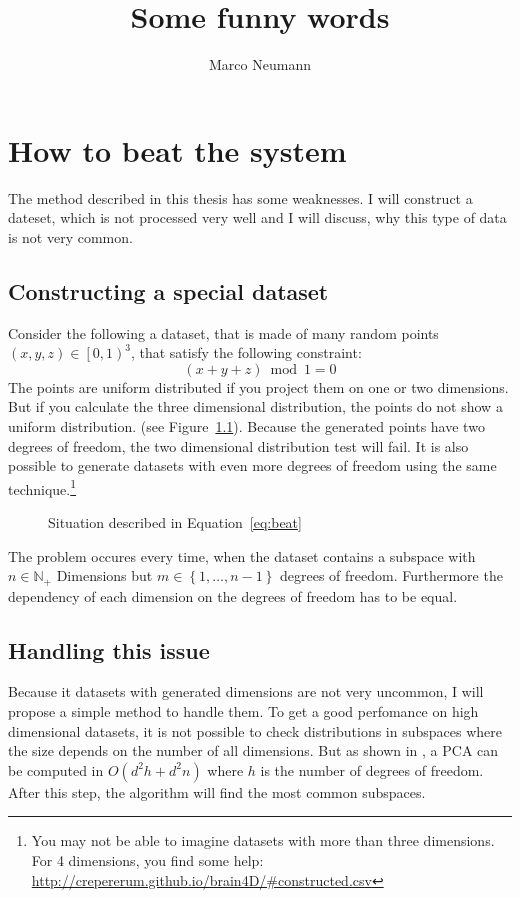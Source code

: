 \documentclass[%
	fontsize=11pt,%
	paper=a4,%
	pagesize,%
	twoside=false,%
	listof=totoc,%
	draft%
]{scrbook}
\title{Some funny words}
\author{Marco Neumann}
\newcommand{\set}[1]{\mathbb{#1}}
\begin{document}
\frontmatter
\maketitle
\tableofcontents

\mainmatter
\chapter{How to beat the system}
The method described in this thesis has some weaknesses. I will construct a dateset, which is not processed very well and I will discuss, why this type of data is not very common.

\section{Constructing a special dataset}\label{sec:constr}
Consider the following a dataset, that is made of many random points $(x, y, z) \in \left[0, 1\right)^3$, that satisfy the following constraint:
\begin{equation}\label{eq:beat}
	(x + y + z) \bmod 1 = 0
\end{equation}
The points are uniform distributed if you project them on one or two dimensions. But if you calculate the three dimensional distribution, the points do not show a uniform distribution. (see Figure~\ref{fig:beat}). Because the generated points have two degrees of freedom, the two dimensional distribution test will fail. It is also possible to generate datasets with even more degrees of freedom using the same technique.\footnote{You may not be able to imagine datasets with more than three dimensions. For 4 dimensions, you find some help: \url{http://crepererum.github.io/brain4D/\#constructed.csv}}
\begin{figure}
	
	\caption{Situation described in Equation~\ref{eq:beat}}
	\label{fig:beat}
\end{figure}

The problem occures every time, when the dataset contains a subspace with $n \in \set{N}_+$ Dimensions but $m \in \left\{1,\dots,n-1\right\}$ degrees of freedom. Furthermore the dependency of each dimension on the degrees of freedom has to be equal.

\section{Handling this issue}
Because it datasets with generated dimensions are not very uncommon, I will propose a simple method to handle them. To get a good perfomance on high dimensional datasets, it is not possible to check distributions in subspaces where the size depends on the number of all dimensions. But as shown in \cite{journals/prl/SharmaP07}, a PCA can be computed in $O\left( d^2h + d^2n \right)$ where $h$ is the number of degrees of freedom. After this step, the algorithm will find the most common subspaces.
\end{document}
